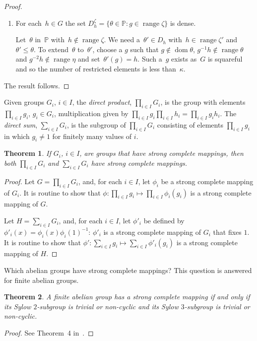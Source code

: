 \documentclass[12pt,a4paper]{article}
\newtheorem{thm}{Theorem}[section]
\DeclareMathOperator{\dom}{dom}
\DeclareMathOperator{\ran}{range}
\renewcommand{\P}{\mathbb{P}}
\begin{document}
\begin{proof}
\begin{enumerate}
\item For each~$h \in G$ the set  $D_h^{\zeta} = \{ \theta \in \P : g \in \ran \zeta \}$ is dense.

Let~$\theta$ in~$\P$ with~$h \not\in \ran \zeta$.  We need a~$\theta' \in D_h$ with~$h \in \ran \zeta'$ and $\theta' \leq \theta$.
To extend~$\theta$ to~$\theta'$,  choose a $g$ such that $g \not\in \dom \theta$, $g^{-1}h \not\in \ran \theta$ and $g^{-2}h \not\in \ran \eta$ and set~$\theta'(g) = h$.  Such a~$g$ exists as~$G$ is squareful and so the number of restricted elements is less than~$\kappa$.
\end{enumerate}

The result follows.
\end{proof}

Given groups $G_i$, $i\in I$, the {\em direct product}, $\prod_{i\in I}G_i$, is the group with elements $\prod_{i\in I}g_i$, $g_i\in G_i$, multiplication given by $\prod_{i\in I}g_i\prod_{i\in I}h_i=\prod_{i\in I}g_ih_i$. The {\em direct sum}, $\sum_{i\in I}G_i$, is the subgroup of $\prod_{i\in I}G_i$ consisting of elements $\prod_{i\in I}g_i$ in which $g_i\ne 1$ for finitely many values of $i$. 

\begin{thm}\label{thm:direct}
If $G_i$, $i\in I$, are groups that have strong complete mappings, then both $\prod_{i\in I}G_i$ and $\sum_{i\in I}G_i$ have strong complete mappings.
\end{thm}
\begin{proof}
Let $G=\prod_{i\in I}G_i$, and, for each $i\in I$, let $\phi_i$ be a strong complete mapping of $G_i$. It is routine to show that $\phi\colon \prod_{i\in I}g_i\mapsto \prod_{i\in I}\phi_i(g_i)$ is a strong complete mapping of $G$.
 
Let $H=\sum_{i\in I}G_i$, and, for each $i\in I$, let $\phi'_i$ be defined by $\phi'_i(x)=\phi_i(x)\phi_i(1)^{-1}$: $\phi'_i$ is a strong complete mapping of $G_i$ that fixes $1$. It is routine to show that $\phi'\colon \sum_{i\in I}g_i\mapsto \sum_{i\in I}\phi'_i(g_i)$ is a strong complete mapping of $H$.
\end{proof}

Which abelian groups have strong complete mappings? This question is answered for finite abelian groups. 

\begin{thm}\label{thm:finite2gps}
A finite abelian  group has a strong complete mapping if and only if its Sylow $2$-subgroup is trivial or non-cyclic and its Sylow $3$-subgroup is trivial or non-cyclic.
\end{thm}
\begin{proof}
See Theorem~4 in~\cite{Evans12}.
\end{proof}
\end{document}
